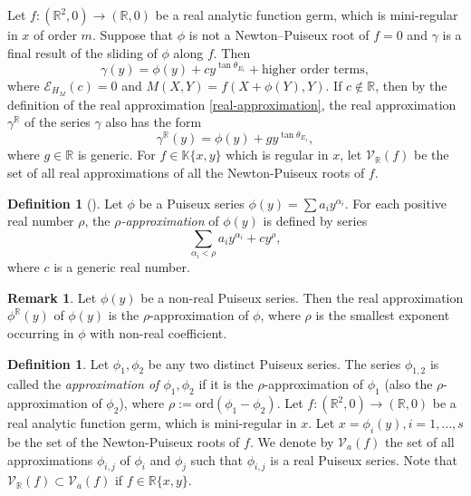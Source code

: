 \documentclass[reqno, 12pt ,a4letter]{amsart}
\theoremstyle{definition}
\newtheorem {definition}[theorem]{Definition}
\newtheorem {remark}[theorem]{Remark}
\begin{document}
Let $f\colon (\mathbb{R}^2,0) \to (\mathbb{R},0)$ be a real analytic function germ, which is mini-regular in $x$ of order $m$. Suppose that $\phi$ is not a Newton--Puiseux root of $f = 0$ and $\gamma$ is a final result of the sliding of $\phi$ along $f$. Then
$$\gamma(y)  = \phi(y) + c y^{\tan \theta_{E_1}}+ \text{higher order terms},$$
where $\mathcal{E}_{H_{M}}(c) = 0$ and $M(X,Y) = f(X + \phi(Y),Y)$. If $c \notin \mathbb{R}$, then by the definition of the real approximation \eqref{real-approximation}, the real approximation $\gamma^{\mathbb{R}}$ of the series $\gamma$ also has the form 
\begin{equation}\label{real-approximation2}
	\gamma^{\mathbb{R}}(y) = \phi(y) + g y^{\tan \theta_{E_1}},	
\end{equation}	
where $g \in \mathbb{R}$ is generic. For $f \in \mathbb{K}\{x,y\}$ which is regular in $x$, let $\mathcal{V}_{\mathbb{R}}(f)$ be the set of all real approximations of all the Newton-Puiseux roots of $f$.
\begin{definition}[\cite{Nguyen2019}]
Let $\phi$ be a Puiseux series $\phi(y) = \sum a_iy^{\alpha_i}$. For each positive real number $\rho$, the {\em $\rho$-approximation} of $\phi(y)$ is defined by series 
$$ \sum_{\alpha_i < \rho} a_iy^{\alpha_i} + cy^\rho, $$ where $c$ is a generic real number.
\end{definition}
\begin{remark}
Let $\phi(y)$ be a non-real Puiseux series. Then the real approximation $\phi^{\mathbb{R}}(y)$ of $\phi(y)$ is the $\rho$-approximation of $\phi$, where $\rho$ is the smallest exponent occurring in $\phi$ with non-real coefficient. %
\end{remark}
\begin{definition}\label{approximation}
    Let $\phi_1, \phi_2$ be any two distinct Puiseux series. The series $\phi_{1,2}$ is called the {\em approximation of $\phi_1, \phi_2$} if it is the $\rho$-approximation of $\phi_1$ (also the $\rho$-approximation of $\phi_2$), where $\rho := \text{ord}(\phi_1 - \phi_2)$. Let $f\colon (\mathbb{R}^2,0) \to (\mathbb{R},0)$ be a real analytic function germ, which is mini-regular in $x$. Let $x=\phi_i(y), i=1,\ldots,s$ be the set of the Newton-Puiseux roots of $f$. We denote by $\mathcal{V}_a(f)$ the set of all approximations $\phi_{i,j}$ of $\phi_i$ and $\phi_j$ such that $\phi_{i,j}$ is a real Puiseux series. Note that $\mathcal{V}_{\mathbb{R}}(f) \subset \mathcal{V}_a(f)$ if $f \in \mathbb{R}\{x,y\}$.
\end{definition}
\end{document}
